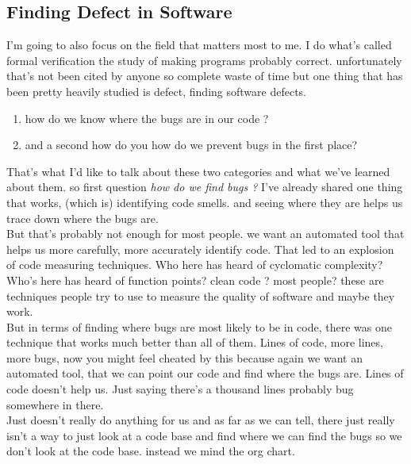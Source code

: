 \documentclass[14pt]{extreport}
\begin{document}
\subsection{Finding Defect in Software} %
\label{sub:finding_defect_in_software}
I'm going to also focus on the field that matters
most to me. 
I do what's called formal verification the study of making
programs probably correct. 
unfortunately that's not been cited by anyone so
complete waste of time but one thing
that has been pretty heavily studied is
defect, finding software defects. 
\begin{enumerate}
	\item how do we know where the bugs are in our code ?
	\item and a second how do you how do we prevent bugs in the first place?
\end{enumerate}
That's what I'd like to talk about these two categories and what we've learned
about them.
so first question \textit{how do we find bugs ?}
I've already shared one thing that works, (which is) identifying code smells. and seeing where they are helps us trace down where the bugs are. \\
But that's probably not enough for most people.
we want an automated tool that helps us more carefully, more accurately identify code. 
That led to an explosion of code measuring techniques.
Who here has heard of cyclomatic complexity?
Who's here has heard of function points? clean code ? 
most people? 
these are techniques people try to use to measure the quality of
software and maybe they work. \\
But in terms of finding where bugs are most likely to be in code, there was one technique that works much better than all of them. 
Lines of code, more lines, more bugs, now you might feel cheated by this because again we want an automated tool, that we can point our code and find where the bugs are. 
Lines of code doesn't help us. Just saying there's a thousand lines probably bug somewhere in there.\\
Just doesn't really do anything for us and as far as we can tell,
there just really isn't a way to just look at a code base and find where we can find the bugs so we don't look at the code base. 
instead we mind the org chart. 
\end{document}
